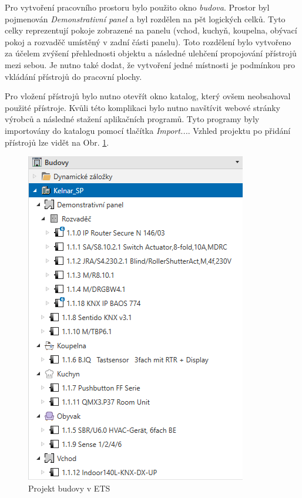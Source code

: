 Pro vytvoření pracovního prostoru bylo použito okno \textit{budova}. Prostor byl pojmenován \textit{Demonstrativní panel} a byl rozdělen na pět logických celků. Tyto celky reprezentují pokoje zobrazené na panelu (vchod, kuchyň, koupelna, obývací pokoj a rozvaděč umístěný v zadní části panelu). Toto rozdělení bylo vytvořeno za účelem zvýšení přehlednosti objektu a následné ulehčení propojování přístrojů mezi sebou. Je nutno také dodat, že vytvoření jedné místnosti je podmínkou pro vkládání přístrojů do pracovní plochy.

Pro vložení přístrojů bylo nutno otevřít okno katalog, který ovšem neobsahoval použité přístroje. Kvůli této komplikaci bylo nutno navštívit webové stránky výrobců a následné stažení aplikačních programů. Tyto programy byly importovány do katalogu pomocí tlačítka \textit{Import...}. Vzhled projektu po přidání přístrojů lze vidět na Obr. \ref{fig:Projekt budovy v ETS}.

\begin{figure}[!h]
  \begin{center}
    \includegraphics[scale=0.7]{obrazky/Budova.png}
  \end{center}
  \caption[Projekt budovy v ETS]{Projekt budovy v ETS}
  \label{fig:Projekt budovy v ETS}
\end{figure}


